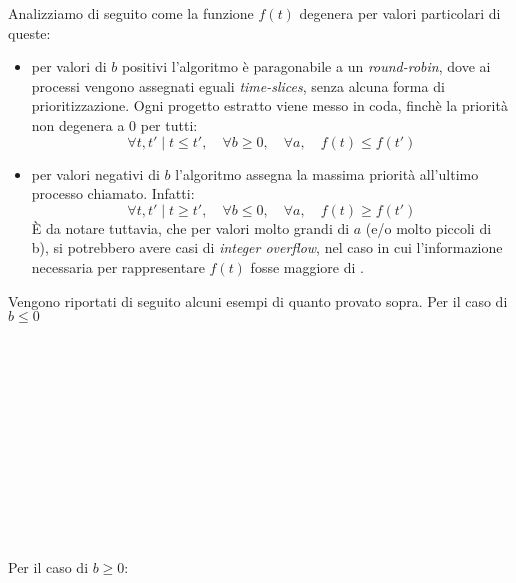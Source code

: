 \documentclass[11pt]{article}
\begin{document}
Analizziamo di seguito come la funzione
$f(t)$ degenera per valori particolari di queste:
\begin{itemize}
\item per valori di $b$ positivi l'algoritmo \`e paragonabile a un \emph{round-robin}, dove ai processi
 vengono assegnati eguali \emph{time-slices}, senza alcuna forma di prioritizzazione. Ogni progetto estratto
viene messo in coda, finch\`e la priorit\`a non degenera a $0$ per tutti:
$$
\forall t, t'\mid t \le t', \quad \forall b \ge 0,\quad \forall a,
\quad f(t) \le f(t')
$$

\item per valori negativi di $b$ l'algoritmo assegna la massima priorit\`a all'ultimo processo chiamato.
Infatti:
$$
\forall t, t'\mid t \ge t', \quad \forall b \le 0,\quad \forall a,
\quad f(t) \ge f(t')
$$
\`E da notare tuttavia, che per valori molto grandi di $a$ (e/o molto piccoli di b),
 si potrebbero avere casi di \emph{integer overflow}, nel caso in cui l'informazione
necessaria per rappresentare $f(t)$ fosse maggiore di .
\end{itemize}
Vengono riportati di seguito alcuni esempi di quanto provato sopra. Per il caso di $b \le 0$
\\
\\
\\
\\
\\ 
\\
\\
\\
\\
\\
\\
\\
\\Per il caso di $b \ge 0$:
\\
\\
\\
\\
\\ 
\\
\\
\end{document}

